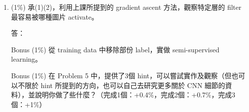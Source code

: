 \documentclass[12pt,a4paper]{extarticle}
\begin{document}
\begin{enumerate}
  \newpage

	\item (1\%) 承(1)(2)，利用上課所提到的 gradient ascent 方法，觀察特定層的 filter 最容易被哪種圖片 activate。
	\par 答：

	\item[Bonus] (1\%) 從 training data 中移除部份 label，實做 semi-supervised learning。

	\item[Bonus] (1\%) 在 Problem 5 中，提供了3個 hint，可以嘗試實作及觀察（但也可以不限於 hint 所提到的方向，也可以自己去研究更多關於 CNN 細節的資料），並說明你做了些什麼？（完成1個：+0.4\%，完成2個：+0.7\%，完成3個：+1\%）

\end{enumerate}
\end{document}

